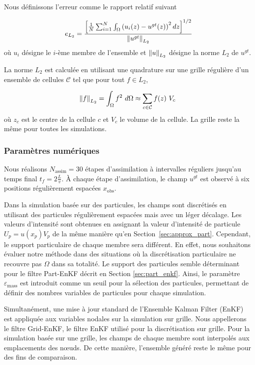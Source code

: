 Nous définissons l'erreur comme le rapport relatif suivant

\begin{equation}~\label{eq:L2_error}
    e_{L_2} = \frac{\left[\frac{1}{N} \sum_{i = 1}^{N} \int_\Omega \left(u_i(z) - u^{gt}(z)\right)^2 dz\right]^{1/2}}{\left\lVert u^{gt} \right\rVert_{L_2}}
\end{equation}
où \(u_i\) désigne le \(i\)-ème membre de l'ensemble et \(\left\lVert u \right\rVert_{L_2}\) désigne la norme \(L_2\) de \(u^{gt}\).

La norme \(L_2\) est calculée en utilisant une quadrature sur une grille régulière d'un ensemble de cellules \(\mathcal{C}\) tel que pour tout \(f \in L_2\),

$$
    \left\lVert f \right\rVert_{L_2} = \int_{\Omega} f^2~d\Omega \approx \sum_{c \in \mathcal{C}} f(z)~V_c
$$
où \(z_c\) est le centre de la cellule \(c\) et \(V_c\) le volume de la cellule. La grille reste la même pour toutes les simulations.

\subsubsection{Paramètres numériques}

Nous réalisons \(N_{\text{assim}} = 30\) étapes d'assimilation à intervalles réguliers jusqu'au temps final \(t_f = 2 \frac{L}{v}\). À chaque étape d'assimilation, le champ \(u^{gt}\) est observé à six positions régulièrement espacées \(x_{\text{obs}}\).

Dans la simulation basée sur des particules, les champs sont discrétisés en utilisant des particules régulièrement espacées mais avec un léger décalage. Les valeurs d'intensité sont obtenues en assignant la valeur d'intensité de particule $U_p = u(x_p) V_p$ de la même manière qu'en Section~\ref{sec:approx_part}. Cependant, le support particulaire de chaque membre sera différent. En effet, nous souhaitons évaluer notre méthode dans des situations où la discrétisation particulaire ne recouvre pas $\Omega$ dans sa totalité. Le support des particules semble déterminant pour le filtre Part-EnKF décrit en Section \ref{sec:part_enkf}. Ainsi, le paramètre \(\varepsilon_{\text{mass}}\) est introduit comme un seuil pour la sélection des particules, permettant de définir des nombres variables de particules pour chaque simulation.

Simultanément, une mise à jour standard de l'Ensemble Kalman Filter (EnKF) est appliquée aux variables nodales sur la simulation sur grille. Nous appellerons le filtre Grid-EnKF, le filtre EnKF utilisé pour la discrétisation sur grille. Pour la simulation basée sur une grille, les champs de chaque membre sont interpolés aux emplacements des nœuds. De cette manière, l'ensemble généré reste le même pour des fins de comparaison.

